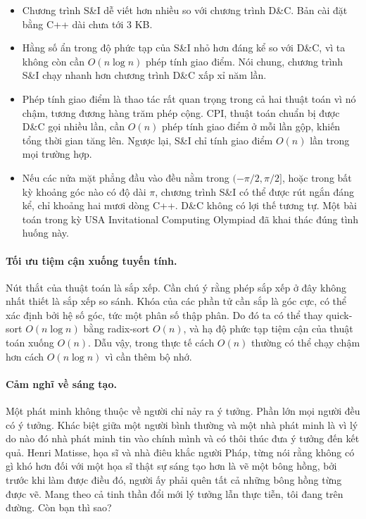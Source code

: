 \documentclass[11pt]{article}
\begin{document}
\begin{itemize}
  \item Chương trình S\&I dễ viết hơn nhiều so với chương trình D\&C. Bản cài
  đặt bằng C++ dài chưa tới 3 KB.

  \item Hằng số ẩn trong độ phức tạp của S\&I nhỏ hơn đáng kể so với D\&C, vì
  ta không còn cần \(O(n\log n)\) phép tính giao điểm. Nói chung, chương trình
  S\&I chạy nhanh hơn chương trình D\&C xấp xỉ năm lần.

  \item Phép tính giao điểm là thao tác rất quan trọng trong cả hai thuật toán
  vì nó chậm, tương đương hàng trăm phép cộng. CPI, thuật toán chuẩn bị được
  D\&C gọi nhiều lần, cần \(O(n)\) phép tính giao điểm ở mỗi lần gộp, khiến
  tổng thời gian tăng lên. Ngược lại, S\&I chỉ tính giao điểm \(O(n)\) lần
  trong mọi trường hợp.

  \item Nếu các nửa mặt phẳng đầu vào đều nằm trong \((-\pi/2,\pi/2]\), hoặc
  trong bất kỳ khoảng góc nào có độ dài \(\pi\), chương trình S\&I có thể được
  rút ngắn đáng kể, chỉ khoảng hai mươi dòng C++. D\&C không có lợi thế tương
  tự. Một bài toán trong kỳ USA Invitational Computing Olympiad đã khai thác
  đúng tình huống này.
\end{itemize}

\paragraph{Tối ưu tiệm cận xuống tuyến tính.}
Nút thắt của thuật toán là sắp xếp. Cần chú ý rằng phép sắp xếp ở đây không
nhất thiết là sắp xếp so sánh. Khóa của các phần tử cần sắp là góc cực, có thể
xác định bởi hệ số góc, tức một phân số thập phân. Do đó ta có thể thay
quick-sort \(O(n\log n)\) bằng radix-sort \(O(n)\), và hạ độ phức tạp tiệm cận
của thuật toán xuống \(O(n)\). Dẫu vậy, trong thực tế cách \(O(n)\) thường có
thể chạy chậm hơn cách \(O(n\log n)\) vì cần thêm bộ nhớ.

\paragraph{Cảm nghĩ về sáng tạo.}
Một phát minh không thuộc về người chỉ nảy ra ý tưởng. Phần lớn mọi người đều
có ý tưởng. Khác biệt giữa một người bình thường và một nhà phát minh là vì lý
do nào đó nhà phát minh tin vào chính mình và có thôi thúc đưa ý tưởng đến kết
quả. Henri Matisse, họa sĩ và nhà điêu khắc người Pháp, từng nói rằng không
có gì khó hơn đối với một họa sĩ thật sự sáng tạo hơn là vẽ một bông hồng, bởi
trước khi làm được điều đó, người ấy phải quên tất cả những bông hồng từng
được vẽ. Mang theo cả tinh thần đổi mới lý tưởng lẫn thực tiễn, tôi đang trên
đường. Còn bạn thì sao?
\end{document}
